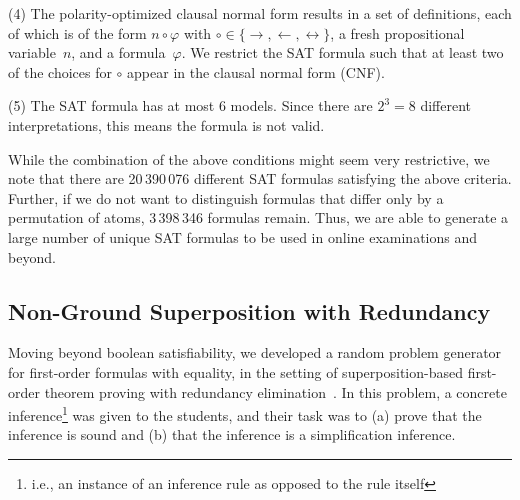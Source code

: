 \noindent(4)
        The polarity-optimized clausal normal form results in a set of definitions,
        each of which is of the form
        $n \circ \varphi$ with $\circ \in \{ \rightarrow, \leftarrow, \leftrightarrow \}$,
        a fresh propositional variable~$n$, and a formula~$\varphi$.
        We restrict the SAT formula such that at least two of the choices for
        $\circ$ appear in the clausal normal form (CNF). \smallskip

\noindent(5)
        The SAT formula has at most $6$ models.
        Since there are $2^3 = 8$ different interpretations,
        this means the formula is not valid.\smallskip



While the combination of the above conditions might seem very restrictive,
we note that 
there are 20\,390\,076 different SAT formulas satisfying the above
criteria. Further, 
if we do not want to distinguish formulas that differ only by a permutation of atoms,
3\,398\,346 formulas remain. Thus, we are able to generate a large
number of unique SAT formulas to be used in online examinations and
beyond.





\subsection{Non-Ground Superposition with Redundancy}\label{sec:fo}

Moving beyond boolean satisfiability, we developed a random problem
generator for first-order formulas with equality, in the setting of
superposition-based first-order theorem proving with redundancy elimination~\cite{Rubio01,Vampire13}.
In this problem, a concrete inference\footnote{i.e., an instance of an inference rule as opposed to the rule itself}
was given to the students, and their task was to
(a) prove that the inference is sound
and (b) that the inference is a simplification inference.


